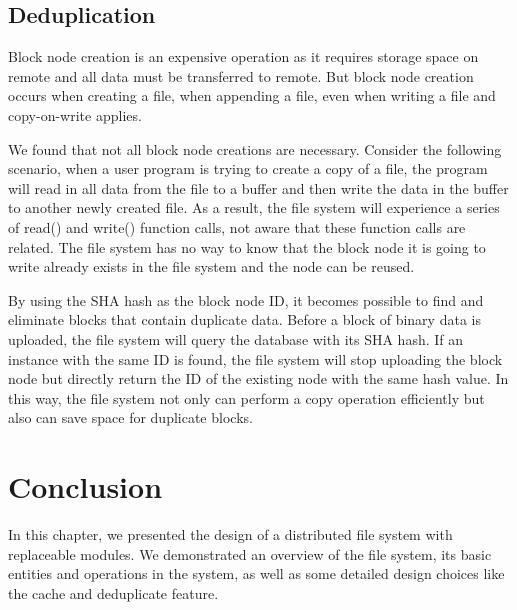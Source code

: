 \subsection{Deduplication}

    Block node creation is an expensive operation as it requires storage space on remote and all data must be transferred to remote. But block node creation occurs when creating a file, when appending a file, even when writing a file and copy-on-write applies.
    
    We found that not all block node creations are necessary. Consider the following scenario, when a user program is trying to create a copy of a file, the program will read in all data from the file to a buffer and then write the data in the buffer to another newly created file. As a result, the file system will experience a series of read() and write() function calls, not aware that these function calls are related. The file system has no way to know that the block node it is going to write already exists in the file system and the node can be reused.

    By using the SHA hash as the block node ID, it becomes possible to find and eliminate blocks that contain duplicate data. Before a block of binary data is uploaded, the file system will query the database with its SHA hash. If an instance with the same ID is found, the file system will stop uploading the block node but directly return the ID of the existing node with the same hash value. In this way, the file system not only can perform a copy operation efficiently but also can save space for duplicate blocks. 

\section{Conclusion}

    In this chapter, we presented the design of a distributed file system with replaceable modules. We demonstrated an overview of the file system, its basic entities and operations in the system, as well as some detailed design choices like the cache and deduplicate feature.
